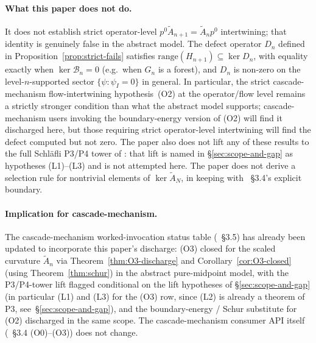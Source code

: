 \documentclass[11pt]{article}
\theoremstyle{plain}
\theoremstyle{definition}
\theoremstyle{remark}
\begin{document}
\paragraph*{What this paper does not do.}
It does not establish strict operator-level
$p^{0} \widetilde A_{n+1} = \widetilde A_n p^{0}$
intertwining; that identity is genuinely false in the abstract
model. The defect operator $D_n$ defined in
Proposition~\ref{prop:strict-fails} satisfies
$\mathrm{range}(H_{n+1}) \subseteq \ker D_n$, with equality exactly
when $\ker \mathcal{B}_n = 0$ (e.g.\ when $G_n$ is a forest), and $D_n$ is
non-zero on the level-$n$-supported sector
$\{\psi : \psi_I = 0\}$ in general. In particular, the strict
cascade-mechanism flow-intertwining hypothesis~(O2) at the
operator/flow level remains a strictly stronger condition than
what the abstract model supports; cascade-mechanism users invoking
the boundary-energy version of (O2) will find it discharged here,
but those requiring strict operator-level intertwining will find
the defect computed but not zero. The paper also does not lift any
of these results to the full Schl\"{a}fli P3/P4 tower of
\cite{CascadeRefinementSpaces, CascadeClosureDynamics}: that lift
is named in
\S\ref{sec:scope-and-gap} as hypotheses
\textup{(L1)}--\textup{(L3)} and is not attempted here. The paper
does not derive a selection rule for nontrivial elements of
$\ker \widetilde A_N$, in keeping with
\cite{CascadeMechanism}~\S3.4's explicit boundary.

\paragraph*{Implication for cascade-mechanism.}
The cascade-mechanism worked-invocation status table
(\cite{CascadeMechanism}~\S3.5) has already been updated to
incorporate this paper's discharge: (O3) closed for the scaled
curvature $\widetilde A_n$ via Theorem~\ref{thm:O3-discharge} and
Corollary~\ref{cor:O3-closed} (using Theorem~\ref{thm:schur}) in
the abstract pure-midpoint model, with the P3/P4-tower lift
flagged conditional on the lift hypotheses of
\S\ref{sec:scope-and-gap} (in particular \textup{(L1)} and
\textup{(L3)} for the (O3) row, since \textup{(L2)} is already a
theorem of P3, see~\S\ref{sec:scope-and-gap}), and the
boundary-energy / Schur substitute for (O2) discharged in the same
scope. The
cascade-mechanism consumer API itself
(\cite{CascadeMechanism}~\S3.4 (O0)--(O3)) does not change.
\end{document}

